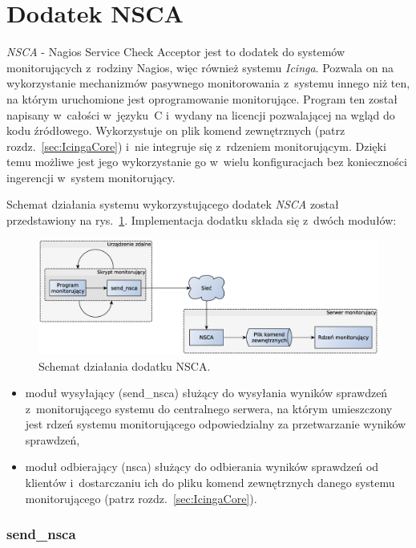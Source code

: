 \section[Dodatek NSCA][Dodatek NSCA]{Dodatek NSCA}
\label{sec:NSCA}

{\em NSCA} - Nagios Service Check Acceptor jest to dodatek do systemów
monitorujących z~rodziny Nagios, więc również systemu {\em Icinga}. Pozwala
on na wykorzystanie mechanizmów pasywnego monitorowania z~systemu
innego niż ten, na którym uruchomione jest oprogramowanie
monitorujące. Program ten został napisany w~całości w~języku~C
i~wydany na licencji pozwalającej na wgląd do kodu
źródłowego. Wykorzystuje on plik komend zewnętrznych (patrz
rozdz.~\ref{sec:IcingaCore}) i~nie integruje się z~rdzeniem
monitorującym. Dzięki temu możliwe jest jego wykorzystanie go w~wielu
konfiguracjach bez konieczności ingerencji w~system monitorujący.

Schemat działania systemu wykorzystującego dodatek {\em NSCA}
został przedstawiony na rys.~\ref{fig:nsca}. Implementacja dodatku
składa się z~dwóch modułów:

\begin{figure}[ht]
  \caption{Schemat działania dodatku NSCA.}
  \label{fig:nsca}
\includegraphics[width=1\textwidth]{img/nsca}
\end{figure}

\begin{itemize}
\item moduł wysyłający (send\_nsca) służący do wysyłania wyników
  sprawdzeń z~monitorującego systemu do centralnego serwera, na którym
  umieszczony jest rdzeń systemu monitorującego odpowiedzialny za
  przetwarzanie wyników sprawdzeń,
\item moduł odbierający (nsca) służący do odbierania wyników sprawdzeń
  od klientów i~dostarczaniu ich do pliku komend zewnętrznych danego
  systemu monitorującego (patrz rozdz.~\ref{sec:IcingaCore}).
\end{itemize}

\subsubsection[send\_nsca][send\_nsca]{send\_nsca}
\label{subsubsec:modulWysylajacy}

